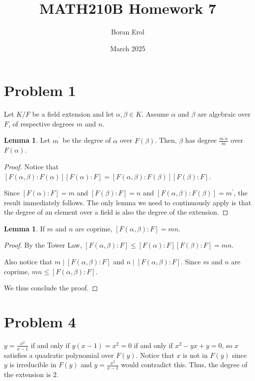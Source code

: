 \documentclass{article}
\title{MATH210B Homework 7}
\date{March 2025}
\author{Boran Erol}
\theoremstyle{definition}
\newtheorem{lemma}[theorem]{Lemma}
\begin{document}
\maketitle

\section{Problem 1}

Let $ K/F $ be a field extension and let $\alpha, \beta \in K$. Assume $\alpha$ and $\beta$
are algebraic over $F$, of respective degrees $m$ and $n$.

\begin{lemma}
    Let $m^{\prime}$ be the degree of $\alpha$ over $F(\beta)$. Then, $\beta$ has degree
    $\frac{m^{\prime}n}{m}$ over $F(\alpha)$.
\end{lemma}
\begin{proof}
    Notice that $[F(\alpha, \beta): F(\alpha)][F(\alpha): F] = [F(\alpha, \beta): F(\beta)][F(\beta): F]$.

    Since $[F(\alpha): F] = m$ and $[F(\beta): F] = n$ and $[F(\alpha, \beta): F(\beta)] = m^{\prime}$, the result
    immediately follows. The only lemma we need to continuously apply is that the degree of an element over a field
    is also the degree of the extension.
\end{proof}

\begin{lemma}
    If $m$ and $n$ are coprime, $[F(\alpha, \beta): F] = mn$.
\end{lemma}
\begin{proof}
    By the Tower Law, $[F(\alpha, \beta): F] \leq [F(\alpha): F][F(\beta): F] = mn$.

    Also notice that $m \mid [F(\alpha, \beta): F]$ and $n \mid [F(\alpha, \beta): F]$.
    Since $m$ and $n$ are coprime, $mn \leq [F(\alpha, \beta): F]$.

    We thus conclude the proof.
\end{proof}


\section{Problem 4}

$ y = \frac{x^{2}}{x - 1} $ if and only if $ y(x-1) = x^{2} = 0 $ if and only if $ x^{2} - yx + y = 0 $,
so $ x $ satisfies a quadratic polynomial over $ F(y) $. Notice that $ x $ is not in $ F(y) $
since $ y $ is irreducible in $ F(y) $ and $ y = \frac{x^{2}}{x - 1} $ would contradict this.
Thus, the degree of the extension is $ 2 $.
\end{document}
